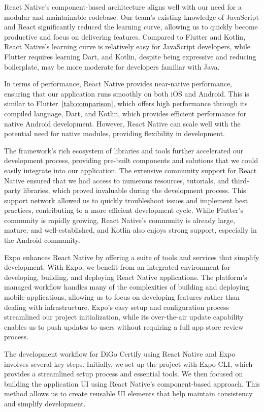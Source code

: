 React Native’s component-based architecture aligns well with our need for a modular and maintainable codebase. Our team’s existing knowledge of JavaScript and React significantly reduced the learning curve, allowing us to quickly become productive and focus on delivering features. Compared to Flutter and Kotlin, React Native's learning curve is relatively easy for JavaScript developers, while Flutter requires learning Dart, and Kotlin, despite being expressive and reducing boilerplate, may be more moderate for developers familiar with Java.

In terms of performance, React Native provides near-native performance, ensuring that our application runs smoothly on both iOS and Android\cite{react-native-performance}. This is similar to Flutter~\ref{tab:comparison}, which offers high performance through its compiled language, Dart, and Kotlin, which provides efficient performance for native Android development. However, React Native can scale well with the potential need for native modules, providing flexibility in development.

The framework’s rich ecosystem of libraries and tools further accelerated our development process, providing pre-built components and solutions that we could easily integrate into our application. The extensive community support for React Native ensured that we had access to numerous resources, tutorials, and third-party libraries, which proved invaluable during the development process. This support network allowed us to quickly troubleshoot issues and implement best practices, contributing to a more efficient development cycle. While Flutter's community is rapidly growing, React Native's community is already large, mature, and well-established, and Kotlin also enjoys strong support, especially in the Android community.

Expo enhances React Native by offering a suite of tools and services that simplify development\cite{Expo}. With Expo, we benefit from an integrated environment for developing, building, and deploying React Native applications. The platform’s managed workflow handles many of the complexities of building and deploying mobile applications, allowing us to focus on developing features rather than dealing with infrastructure. Expo’s easy setup and configuration process streamlined our project initialization, while its over-the-air update capability enables us to push updates to users without requiring a full app store review process.

The development workflow for DiGo Certify using React Native and Expo involves several key steps. Initially, we set up the project with Expo CLI, which provides a streamlined setup process and essential tools. We then focused on building the application UI using React Native’s component-based approach. This method allows us to create reusable UI elements that help maintain consistency and simplify development.

